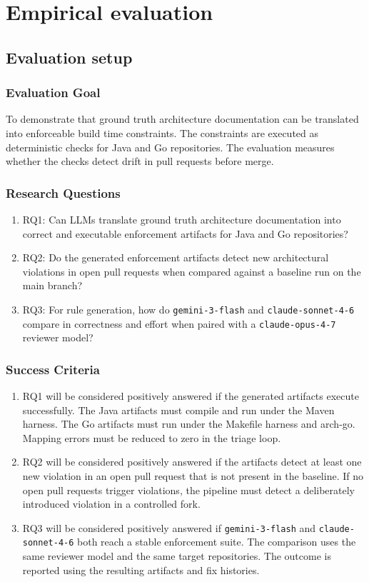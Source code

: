 \documentclass[sigconf,screen]{acmart}
\begin{document}
\section{Empirical evaluation}
\subsection{Evaluation setup}
\subsubsection{Evaluation Goal}
To demonstrate that ground truth architecture documentation can be translated into enforceable build time constraints. The constraints are executed as deterministic checks for Java and Go repositories. The evaluation measures whether the checks detect drift in pull requests before merge.

\subsubsection{Research Questions}
\begin{enumerate}
    \item RQ1: Can LLMs translate ground truth architecture documentation into correct and executable enforcement artifacts for Java and Go repositories?
    \item RQ2: Do the generated enforcement artifacts detect new architectural violations in open pull requests when compared against a baseline run on the main branch?
    \item RQ3: For rule generation, how do \texttt{gemini-3-flash} and \newline\texttt{claude-sonnet-4-6} compare in correctness and effort when paired with a \texttt{claude-opus-4-7} reviewer model?
\end{enumerate}

\subsubsection{Success Criteria}
    \begin{enumerate}
    \item RQ1 will be considered positively answered if the generated artifacts execute successfully. The Java artifacts must compile and run under the Maven harness. The Go artifacts must run under the Makefile harness and arch-go. Mapping errors must be reduced to zero in the triage loop.
    \item RQ2 will be considered positively answered if the artifacts detect at least one new violation in an open pull request that is not present in the baseline. If no open pull requests trigger violations, the pipeline must detect a deliberately introduced violation in a controlled fork.
    \item RQ3 will be considered positively answered if \texttt{gemini-3-flash} and \texttt{claude-sonnet-4-6} both reach a stable enforcement suite. The comparison uses the same reviewer model and the same target repositories. The outcome is reported using the resulting artifacts and fix histories.
\end{enumerate}
\end{document}
